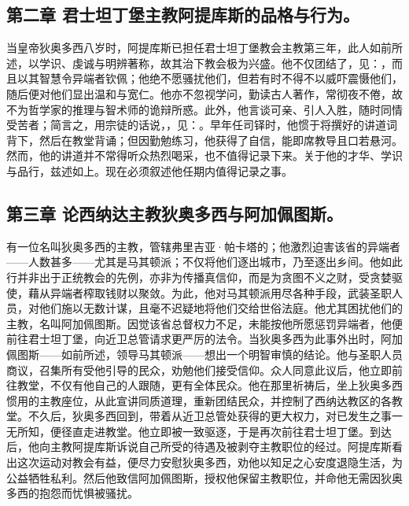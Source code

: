 
\subsection{第二章 君士坦丁堡主教阿提库斯的品格与行为。}

当皇帝狄奥多西八岁时，阿提库斯已担任君士坦丁堡教会主教第三年，此人如前所述，以学识、虔诚与明辨著称，故其治下教会极为兴盛。他不仅团结了，见：，而且以其智慧令异端者钦佩；他绝不愿骚扰他们，但若有时不得不以威吓震慑他们，随后便对他们显出温和与宽仁。他亦不忽视学问，勤读古人著作，常彻夜不倦，故不为哲学家的推理与智术师的诡辩所惑。此外，他言谈可亲、引人入胜，随时同情受苦者；简言之，用宗徒的话说，，见：。早年任司铎时，他惯于将撰好的讲道词背下，然后在教堂背诵；但因勤勉练习，他获得了自信，能即席教导且口若悬河。然而，他的讲道并不常得听众热烈喝采，也不值得记录下来。关于他的才华、学识与品行，兹述如上。现在必须叙述他任期内值得记录之事。\par


\subsection{第三章 论西纳达主教狄奥多西与阿加佩图斯。}

有一位名叫狄奥多西的主教，管辖弗里吉亚·帕卡塔的；他激烈迫害该省的异端者——人数甚多——尤其是马其顿派；不仅将他们逐出城市，乃至逐出乡间。他如此行并非出于正统教会的先例，亦非为传播真信仰，而是为贪图不义之财，受贪婪驱使，藉从异端者榨取钱财以聚敛。为此，他对马其顿派用尽各种手段，武装圣职人员，对他们施以无数计谋，且毫不迟疑地将他们交给世俗法庭。他尤其困扰他们的主教，名叫阿加佩图斯。因觉该省总督权力不足，未能按他所愿惩罚异端者，他便前往君士坦丁堡，向近卫总管请求更严厉的法令。当狄奥多西为此事外出时，阿加佩图斯——如前所述，领导马其顿派——想出一个明智审慎的结论。他与圣职人员商议，召集所有受他引导的民众，劝勉他们接受信仰。众人同意此议后，他立即前往教堂，不仅有他自己的人跟随，更有全体民众。他在那里祈祷后，坐上狄奥多西惯用的主教座位，从此宣讲同质道理，重新团结民众，并控制了西纳达教区的各教堂。不久后，狄奥多西回到，带着从近卫总管处获得的更大权力，对已发生之事一无所知，便径直走进教堂。他立即被一致驱逐，于是再次前往君士坦丁堡。到达后，他向主教阿提库斯诉说自己所受的待遇及被剥夺主教职位的经过。阿提库斯看出这次运动对教会有益，便尽力安慰狄奥多西，劝他以知足之心安度退隐生活，为公益牺牲私利。然后他致信阿加佩图斯，授权他保留主教职位，并命他无需因狄奥多西的抱怨而忧惧被骚扰。\par

